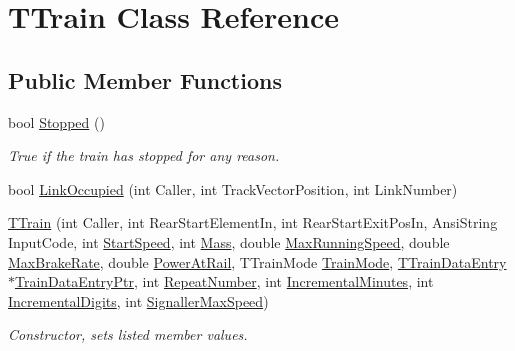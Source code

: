 \hypertarget{class_t_train}{}\section{T\+Train Class Reference}
\label{class_t_train}
\subsection*{Public Member Functions}
\begin{DoxyCompactItemize}
\item 
\mbox{\label{class_t_train_a2a2d78164c9dc1881b2c77526f04903f}} 
bool \mbox{\hyperlink{class_t_train_a2a2d78164c9dc1881b2c77526f04903f}{Stopped}} ()
\begin{DoxyCompactList}\small\item\em True if the train has stopped for any reason. \end{DoxyCompactList}\item 
bool \mbox{\hyperlink{class_t_train_aef32cd9a007874ab09ceeac907e7c88b}{Link\+Occupied}} (int Caller, int Track\+Vector\+Position, int Link\+Number)
\item 
\mbox{\label{class_t_train_ae9d788d7bf536de1efe7a67ab5bb8dd7}} 
\mbox{\hyperlink{class_t_train_ae9d788d7bf536de1efe7a67ab5bb8dd7}{T\+Train}} (int Caller, int Rear\+Start\+Element\+In, int Rear\+Start\+Exit\+Pos\+In, Ansi\+String Input\+Code, int \mbox{\hyperlink{class_t_train_adae3a1fd82da0457a983a3ac41cdda3d}{Start\+Speed}}, int \mbox{\hyperlink{class_t_train_ab9dabc7092d31bc27b573e75ac74d0da}{Mass}}, double \mbox{\hyperlink{class_t_train_a0b9ba6ba25c153ba3142f63ec024ccde}{Max\+Running\+Speed}}, double \mbox{\hyperlink{class_t_train_a1cd5cd53f56a05bc4fde337e44bdd6d4}{Max\+Brake\+Rate}}, double \mbox{\hyperlink{class_t_train_a6940d3fe404390d1d345a80bde3f6bf9}{Power\+At\+Rail}}, T\+Train\+Mode \mbox{\hyperlink{class_t_train_a860f87857baefc44a4928311698055a8}{Train\+Mode}}, \mbox{\hyperlink{class_t_train_data_entry}{T\+Train\+Data\+Entry}} $\ast$\mbox{\hyperlink{class_t_train_a28a2217abf201b23fd8b3b92c12038b7}{Train\+Data\+Entry\+Ptr}}, int \mbox{\hyperlink{class_t_train_a459ae11b674cfdccb8872ef25c921fd9}{Repeat\+Number}}, int \mbox{\hyperlink{class_t_train_a8601120683e9bf4f26b0d1cba75ceed4}{Incremental\+Minutes}}, int \mbox{\hyperlink{class_t_train_a7390e5172ab0a5aa998df94953e43fba}{Incremental\+Digits}}, int \mbox{\hyperlink{class_t_train_ad11759e49fa6fcf8367090ef1db490b7}{Signaller\+Max\+Speed}})
\begin{DoxyCompactList}\small\item\em Constructor, sets listed member values. \end{DoxyCompactList}\end{DoxyCompactItemize}
